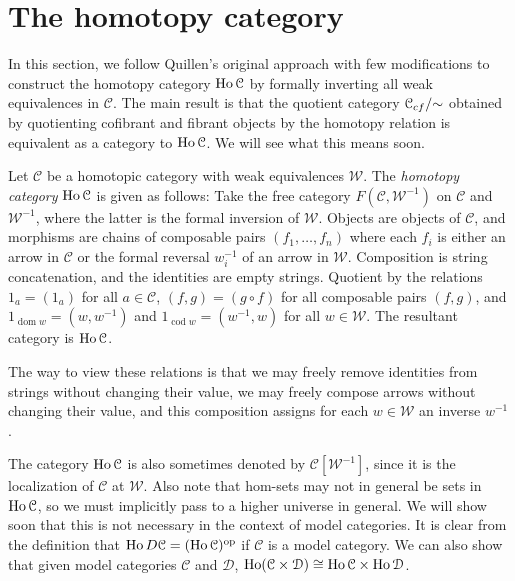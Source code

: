 \section{The homotopy category}

In this section, we follow Quillen's original approach with few modifications to construct the homotopy category $\operatorname{Ho} \mathcal{C} $ by formally inverting all weak equivalences in $\mathcal{C} $. The main result is that the quotient category $\mathcal{C} _{cf} /\mathbin{\sim}$ obtained by quotienting cofibrant and fibrant objects by the homotopy relation is equivalent as a category to $\operatorname{Ho} \mathcal{C} $. We will see what this means soon.

\begin{definition}\label{1.2.1}
Let $\mathcal{C}$ be a homotopic category with weak equivalences $\mathcal{W} $. The \emph{homotopy category} $\operatorname{Ho} \mathcal{C} $ is given as follows: Take the free category $F(\mathcal{C} ,\mathcal{W} ^{-1} )$ on $\mathcal{C} $ and $\mathcal{W} ^{-1} $, where the latter is the formal inversion of $\mathcal{W} $. Objects are objects of $\mathcal{C} $, and morphisms are chains of composable pairs $(f_1, \ldots ,f_n)$ where each $f_i$ is either an arrow in $\mathcal{C} $ or the formal reversal $w^{-1} _i$ of an arrow in $\mathcal{W} $. Composition is string concatenation, and the identities are empty strings. Quotient by the relations $1_a=(1_a)$ for all $a\in \mathcal{C} $, $(f,g)=(g\circ f)$ for all composable pairs $(f,g)$, and $1_{\operatorname{dom} w} =(w,w^{-1} )$ and $1_{\operatorname{cod} w} =(w^{-1} ,w)$ for all $w\in \mathcal{W} $. The resultant category  is $\operatorname{Ho} \mathcal{C} $.
\end{definition}

\begin{intuition}\label{1.2.2}
	The way to view these relations is that we may freely remove identities from strings without changing their value, we may freely compose arrows without changing their value, and this composition assigns for each $w\in \mathcal{W} $ an inverse $w^{-1}$.
\end{intuition}

\begin{remark}\label{1.2.3}
	The category $\operatorname{Ho} \mathcal{C} $ is also sometimes denoted by $\mathcal{C} [\mathcal{W} ^{-1} ]$, since it is the localization of $\mathcal{C} $ at $\mathcal{W}$. Also note that hom-sets may not in general be sets in $\operatorname{Ho} \mathcal{C} $, so we must implicitly pass to a higher universe in general. We will show soon that this is not necessary in the context of model categories. It is clear from the definition that $\operatorname{Ho} D\mathcal{C} =(\operatorname{Ho} \mathcal{C} )^{\mathrm{op}} $ if $\mathcal{C} $ is a model category. We can also show that given model categories $\mathcal{C} $ and $\mathcal{D} $, $\operatorname{Ho} (\mathcal{C} \times \mathcal{D} )\cong \operatorname{Ho} \mathcal{C} \times \operatorname{Ho} \mathcal{D} $.
\end{remark}

